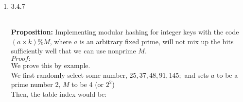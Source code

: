 \documentclass[11pt]{article}
\begin{document}
\begin{enumerate}
\begin{solution}\\
{\bf Proposition:} For a modular hash function with prime $M$, two keys that are interger differring by $2^p$ with $p \in N$  have different hash values.\\
$Proof:$\\
We prove by contradiction.\\
Suppose the proposition above is false, which is, for a modular hash function with prime $M$, two keys that are interger differring by $2^p$ with $p \in N$  have the same hash values\\
Then,

\begin{quote}
$k\%M=(k-2^p)\%M$\\
For key $a$, we have:\\
$k=aM+r, a \in \mathbb{N}$\\
For key $b$, we have:\\
$k-2^p=bM+r, b \in \mathbb{N}$\\
$aM+r =bM+r+2^p$\\
$(a-b)M=2^P$
\end{quote}

If $(a-b)M=2^P$, both sides would have to contain $M$. However, this is not possible for the right side of the equation given that $M \not= 2$. This is because $2^p$ only gives prime factorization with values of 2 without $M$.\\
Following that, the contradiction of the proposition is false.\\
$\therefore$ The proposition "For a modular hash function with prime $M$, two keys that are interger differring by $2^p$ with $p \in N$  have different hash values" is $true$. 

\end{solution}


\item 3.4.7

\begin{solution}\\
{\bf Proposition:} Implementing modular hashing for integer keys with the code $(a \times k) \% M$, where $a$ is an arbitrary fixed prime, will not mix up the bits sufficiently well that we can use nonprime $M$.\\
$Proof:$\\
We prove this by example. \\
We first randomly select some number, $25, 37, 48, 91, 145;$ and sets $a$ to be a prime number 2, $M$ to be 4 (or $2^2$)\\
Then, the table index would be:


\end{solution}
\end{enumerate}
\end{document}

